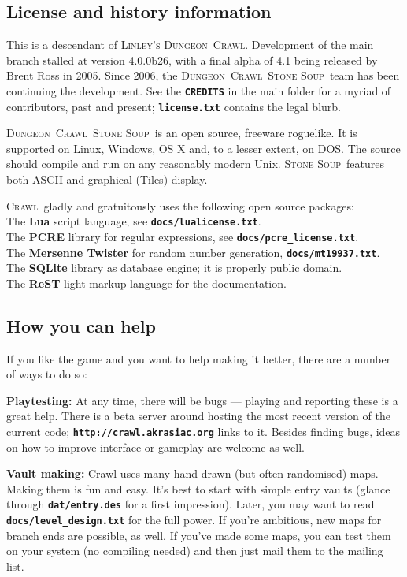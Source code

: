 \documentclass[a4paper,10pt]{article}
\newcommand{\key}[1]{{{\texttt{\textbf{#1}}}}} %
\newcommand{\crawl}{\textsc{Crawl}}
\newcommand{\dungeon}{\textsc{Dungeon}}
\newcommand{\soup}{\textsc{Stone Soup}}
\newcommand{\para}{\vspace{1.5ex}}
\begin{document}
\subsection*{License and history information}

This is a descendant of \textsc{Linley's} \dungeon\ \crawl. 
Development of the main branch stalled at version 4.0.0b26, with a final 
alpha of 4.1 being released by Brent Ross in 2005. Since 2006, the 
\dungeon\ \crawl\ \soup\ team has been continuing the 
development. See the \key{CREDITS} in the main folder for a myriad of 
contributors, past and present; \key{license.txt} contains the legal blurb.

\dungeon\ \crawl\ \soup\ is an open source, freeware roguelike. It is 
supported on Linux, Windows, OS X  and, to a lesser extent, on DOS. The 
source should compile and run on any reasonably modern Unix. \soup\ 
features both ASCII and graphical (Tiles) display.

\crawl\ gladly and gratuitously uses the following open source packages: \\
The \textbf{Lua} script language, see \key{docs/lualicense.txt}.\\
The \textbf{PCRE} library for regular expressions, see 
    \key{docs/pcre\_license.txt}.\\
The \textbf{Mersenne Twister} for random number generation, 
    \key{docs/mt19937.txt}.\\
The \textbf{SQLite} library as database engine; it is properly public domain.\\
The \textbf{ReST} light markup language for the documentation.

\subsection*{How you can help}

If you like the game and you want to help making it better, there are a number 
of ways to do so:

\para

\textbf{Playtesting:}
At any time, there will be bugs --- playing and reporting these is a great 
help. There is a beta server around hosting the most recent version of the 
current code; \key{http://crawl.akrasiac.org} links to it. Besides finding bugs, ideas on 
how to improve interface or gameplay are welcome as well.

\para

\textbf{Vault making:}
Crawl uses many hand-drawn (but often randomised) maps. Making them is fun 
and easy. It's best to start with simple entry vaults (glance through 
\key{dat/entry.des} for a first impression). Later, you may want to read 
\key{docs/level\_design.txt} for the full power. If you're ambitious, new 
maps for branch ends are possible, as well.
If you've made some maps, you can test them on your system (no compiling 
needed) and then just mail them to the mailing list.
\end{document}
